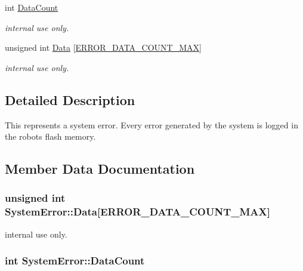 \begin{DoxyCompactItemize}
int \hyperlink{struct_system_error_a4dee5912321faa5febee95c54ab15861}{Data\+Count}
\begin{DoxyCompactList}\small\item\em internal use only. \end{DoxyCompactList}\item 
unsigned int \hyperlink{struct_system_error_aa52f426b11ff538332ae93e856e987bf}{Data} \mbox{[}\hyperlink{_kinova_types_8h_a5314906c9cb074ea4439ad242e230522}{E\+R\+R\+O\+R\+\_\+\+D\+A\+T\+A\+\_\+\+C\+O\+U\+N\+T\+\_\+\+M\+AX}\mbox{]}
\begin{DoxyCompactList}\small\item\em internal use only. \end{DoxyCompactList}\end{DoxyCompactItemize}


\subsection{Detailed Description}
This represents a system error. Every error generated by the system is logged in the robot\textquotesingle{}s flash memory. 

\subsection{Member Data Documentation}
\subsubsection[{\texorpdfstring{Data}{Data}}]{\setlength{\rightskip}{0pt plus 5cm}unsigned int System\+Error\+::\+Data\mbox{[}{\bf E\+R\+R\+O\+R\+\_\+\+D\+A\+T\+A\+\_\+\+C\+O\+U\+N\+T\+\_\+\+M\+AX}\mbox{]}}\hypertarget{struct_system_error_aa52f426b11ff538332ae93e856e987bf}{}\label{struct_system_error_aa52f426b11ff538332ae93e856e987bf}


internal use only. 

\subsubsection[{\texorpdfstring{Data\+Count}{DataCount}}]{\setlength{\rightskip}{0pt plus 5cm}int System\+Error\+::\+Data\+Count}\hypertarget{struct_system_error_a4dee5912321faa5febee95c54ab15861}{}\label{struct_system_error_a4dee5912321faa5febee95c54ab15861}



